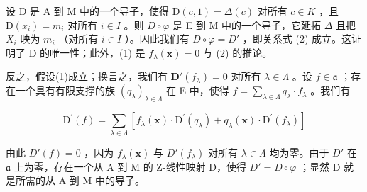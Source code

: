 设 D 是 A 到 M 中的一个导子，使得 \(\mathrm{D}(c,1)=\Delta(c)\) 对所有 \(c\in K\) ，且 \(\mathrm{D}(x_{i})=m_{i}\) 对所有 \(i\in I\) 。则 \(D\circ\varphi\) 是 E 到 M 中的一个导子，它延拓 \(\Delta\) 且把 \(X_{i}\) 映为 \(m_{i}\) （对所有 \(i\in I\) ）。因此我们有 \(D\circ\varphi=D'\) ，即关系式 (2) 成立。这证明了 D 的唯一性；此外，(1) 是 \(f_{\lambda}(\mathbf{x})=0\) 与 (2) 的推论。

反之，假设(1)成立；换言之，我们有 \(\mathbf{D}'(f_{\lambda}) = 0\) 对所有 \(\lambda \in \Lambda\) 。设 \(f \in \mathfrak{a}\) ；存在一个具有有限支撑的族 \((q_{\lambda})_{\lambda \in \Lambda}\) 在 E 中，使得 \(f = \sum_{\lambda \in \Lambda} q_{\lambda} \cdot f_{\lambda}\) 。我们有

\[
\mathrm{D} ^ {\prime} (f) = \sum_ {\lambda \in \Lambda} \left[ f _ {\lambda} (\mathbf {x}) \cdot \mathrm{D} ^ {\prime} (q _ {\lambda}) + q _ {\lambda} (\mathbf {x}) \cdot \mathrm{D} ^ {\prime} (f _ {\lambda}) \right]
\]

由此 \(D'(f) = 0\) ，因为 \(f_{\lambda}(\mathbf{x})\) 与 \(D'(f_{\lambda})\) 对所有 \(\lambda \in \Lambda\) 均为零。由于 \(D'\) 在 \(\mathfrak{a}\) 上为零，存在一个从 A 到 M 的 Z-线性映射 D，使得 \(D' = D \circ \varphi\) ；显然 D 就是所需的从 A 到 M 中的导子。

